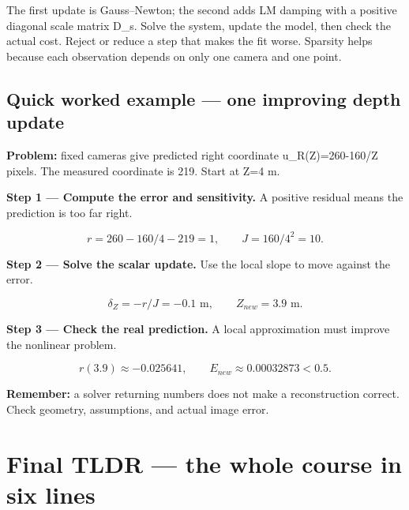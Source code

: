 \documentclass[11pt,letterpaper]{article}
\begin{document}
The first update is Gauss–Newton; the second adds LM damping with a positive diagonal scale matrix D\_s. Solve the system, update the model, then check the actual cost. Reject or reduce a step that makes the fit worse. Sparsity helps because each observation depends on only one camera and one point.



\subsection*{Quick worked example — one improving depth update}


\textbf{Problem:} fixed cameras give predicted right coordinate u\_R(Z)=260-160/Z pixels. The measured coordinate is 219. Start at Z=4 m.



\textcolor{StepRed}{\textbf{Step 1 — Compute the error and sensitivity.} A positive residual means the prediction is too far right.}



\begin{tcolorbox}\color{MathBlue}\[r=260-160/4-219=1,\qquad J=160/4^2=10.\]\end{tcolorbox}


\textcolor{StepRed}{\textbf{Step 2 — Solve the scalar update.} Use the local slope to move against the error.}



\begin{tcolorbox}\color{MathBlue}\[\delta_Z=-r/J=-0.1\text{ m},\qquad Z_{new}=3.9\text{ m}.\]\end{tcolorbox}


\textcolor{StepRed}{\textbf{Step 3 — Check the real prediction.} A local approximation must improve the nonlinear problem.}



\begin{tcolorbox}\color{MathBlue}\[r(3.9)\approx-0.025641,\qquad E_{new}\approx0.00032873<0.5.\]\end{tcolorbox}


\textbf{Remember:} a solver returning numbers does not make a reconstruction correct. Check geometry, assumptions, and actual image error.



\section*{Final TLDR — the whole course in six lines}
\end{document}
